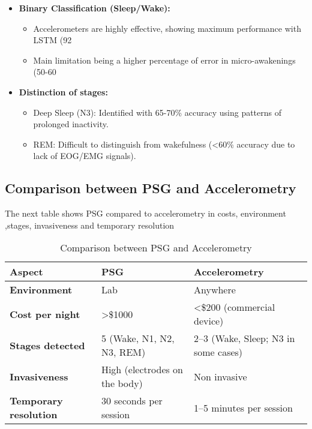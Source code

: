 \documentclass[conference]{IEEEtran}
\begin{document}
\begin{itemize}
	\item \textbf{Binary Classification (Sleep/Wake):}
	      \begin{itemize}
		      \item Accelerometers are highly effective, showing maximum performance with LSTM (92%
		      \item Main limitation being a higher percentage of error in micro-awakenings (50-60%
	      \end{itemize}
	\item \textbf{Distinction of stages:}
	      \begin{itemize}
		      \item Deep Sleep (N3): Identified with 65-70\% accuracy using patterns of prolonged inactivity.
		      \item REM: Difficult to distinguish from wakefulness (<60\% accuracy due to lack of EOG/EMG signals).
	      \end{itemize}
\end{itemize}

\subsection{Comparison between PSG and Accelerometry}
    The next table shows PSG compared to accelerometry in costs, environment ,stages, invasiveness and temporary resolution

\begin{table}[h]
\centering
\small
\begin{tabular}{|p{1.4cm}|p{3.0cm}|p{3.4cm}|}
\hline
\textbf{Aspect} & \textbf{PSG} & \textbf{Accelerometry} \\
\hline
\textbf{Environment} & Lab & Anywhere \\
\hline
\textbf{Cost per night} & >\$1000 & <\$200 (commercial device) \\
\hline
\textbf{Stages detected} & 5 (Wake, N1, N2, N3, REM) & 2--3 (Wake, Sleep; N3 in some cases) \\
\hline
\textbf{Invasiveness} & High (electrodes on the body) & Non invasive \\
\hline
\textbf{Temporary resolution} & 30 seconds per session & 1--5 minutes per session \\
\hline
\end{tabular}
\caption{Comparison between PSG and Accelerometry}
\label{tab:psg-vs-acelerometry}
\end{table}
\end{document}
